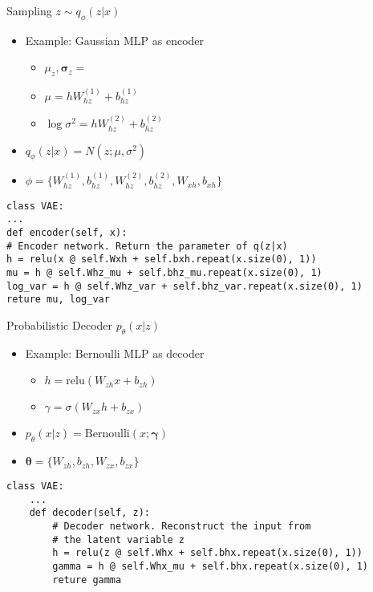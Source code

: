 \documentclass{beamer}
\newcommand{\bernoulli}{\mathrm{Bernoulli}}
\newcommand{\relu}{\mathrm{relu}}
\begin{document}
\begin{frame}[fragile]{Sampling $z\sim q_\phi(z|x)$}
\begin{itemize}
	\item Example: Gaussian MLP as encoder
	\begin{itemize}
		\item $\mu_z, \bm{\sigma}_z=$
		\item $\mu = h W^{(1)}_{hz}+b^{(1)}_{hz}$
		\item $\log \sigma^2 = h W^{(2)}_{hz}+b^{(2)}_{hz}$
	\end{itemize}
	\item $q_\phi(z|x)=N(z;\mu, \sigma^2)$
	\item $\phi = \{W^{(1)}_{hz}, b^{(1)}_{hz}, W^{(2)}_{hz}, b^{(2)}_{hz}, W_{xh}, b_{xh}\}$
\end{itemize}
\begin{verbatim}
class VAE:
...
def encoder(self, x):
# Encoder network. Return the parameter of q(z|x)
h = relu(x @ self.Wxh + self.bxh.repeat(x.size(0), 1))  
mu = h @ self.Whz_mu + self.bhz_mu.repeat(x.size(0), 1)      
log_var = h @ self.Whz_var + self.bhz_var.repeat(x.size(0), 1)
reture mu, log_var
\end{verbatim}
\end{frame}

\begin{frame}[fragile]{Probabilistic Decoder $p_\theta(x|z)$}
\begin{itemize}
	\item Example: Bernoulli MLP as decoder
	\begin{itemize}
		\item $h = \relu\left(W_{zh}x+b_{zh}\right)$
		\item $\gamma = \sigma\left(W_{zx}h+b_{zx}\right)$
	\end{itemize}
	\item $p_\theta(x|z)=\bernoulli(x;\bm{\gamma})$
	\item $\bm{\theta} = \{W_{zh}, b_{zh}, W_{zx}, b_{zx}\}$
\end{itemize}
\begin{verbatim}
class VAE:
    ...
    def decoder(self, z):
        # Decoder network. Reconstruct the input from 
        # the latent variable z
        h = relu(z @ self.Whx + self.bhx.repeat(x.size(0), 1))  
        gamma = h @ self.Whx_mu + self.bhx.repeat(x.size(0), 1)      
        reture gamma
\end{verbatim}
\end{frame}
\end{document}
